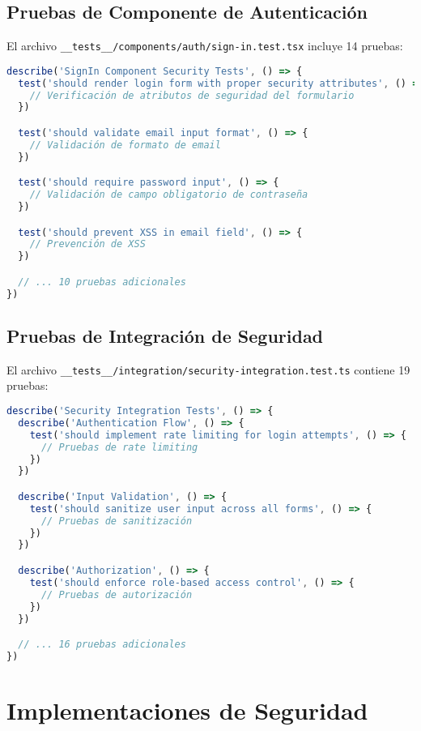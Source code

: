 \documentclass[12pt,a4paper]{article}
\begin{document}
\subsection{Pruebas de Componente de Autenticación}

El archivo \texttt{\_\_tests\_\_/components/auth/sign-in.test.tsx} incluye 14 pruebas:

\begin{lstlisting}[language=TypeScript, caption=Pruebas del Componente de Sign-In]
describe('SignIn Component Security Tests', () => {
  test('should render login form with proper security attributes', () => {
    // Verificación de atributos de seguridad del formulario
  })

  test('should validate email input format', () => {
    // Validación de formato de email
  })

  test('should require password input', () => {
    // Validación de campo obligatorio de contraseña
  })

  test('should prevent XSS in email field', () => {
    // Prevención de XSS
  })

  // ... 10 pruebas adicionales
})
\end{lstlisting}

\subsection{Pruebas de Integración de Seguridad}

El archivo \texttt{\_\_tests\_\_/integration/security-integration.test.ts} contiene 19 pruebas:

\begin{lstlisting}[language=TypeScript, caption=Pruebas de Integración de Seguridad]
describe('Security Integration Tests', () => {
  describe('Authentication Flow', () => {
    test('should implement rate limiting for login attempts', () => {
      // Pruebas de rate limiting
    })
  })

  describe('Input Validation', () => {
    test('should sanitize user input across all forms', () => {
      // Pruebas de sanitización
    })
  })

  describe('Authorization', () => {
    test('should enforce role-based access control', () => {
      // Pruebas de autorización
    })
  })

  // ... 16 pruebas adicionales
})
\end{lstlisting}

\section{Implementaciones de Seguridad}
\end{document}
